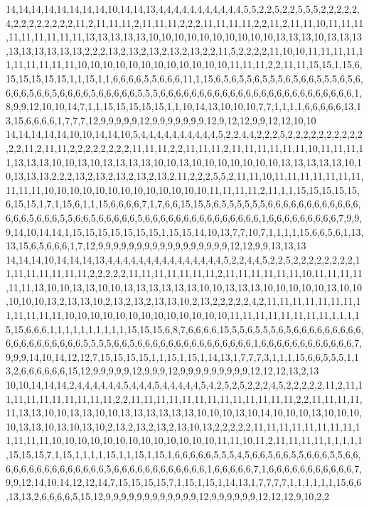 14,14,14,14,14,14,14,14,10,14,14,13,4,4,4,4,4,4,4,4,4,4,4,5,5,2,2,5,2,2,5,5,5,2,2,2,2,2,4,2,2,2,2,2,2,2,2,11,2,11,11,11,2,11,11,11,2,2,2,11,11,11,11,2,2,11,2,11,11,10,11,11,11,11,11,11,11,11,11,13,13,13,13,13,10,10,10,10,10,10,10,10,10,10,13,13,13,10,13,13,13,13,13,13,13,13,13,2,2,2,13,2,13,2,13,2,13,2,13,2,2,11,5,2,2,2,2,11,10,10,11,11,11,11,11,11,11,11,11,11,10,10,10,10,10,10,10,10,10,10,10,10,11,11,11,2,2,11,11,15,15,1,15,6,15,15,15,15,15,1,1,15,1,1,6,6,6,6,5,5,6,6,6,11,1,15,6,5,6,5,5,6,5,5,5,6,5,6,6,5,5,5,6,5,6,6,6,6,5,6,6,5,6,6,6,6,5,6,6,6,6,6,5,5,5,6,6,6,6,6,6,6,6,6,6,6,6,6,6,6,6,6,6,6,6,6,6,6,6,6,1,8,9,9,12,10,10,14,7,1,1,15,15,15,15,15,1,1,10,14,13,10,10,10,7,7,1,1,1,1,6,6,6,6,6,13,13,15,6,6,6,6,1,7,7,7,12,9,9,9,9,9,12,9,9,9,9,9,9,9,12,9,12,12,9,9,12,12,10,10
14,14,14,14,14,10,10,14,14,10,5,4,4,4,4,4,4,4,4,4,4,5,2,2,4,4,2,2,2,5,2,2,2,2,2,2,2,2,2,2,2,2,11,2,11,11,2,2,2,2,2,2,2,2,11,11,11,2,2,11,11,11,2,11,11,11,11,11,11,10,11,11,11,11,13,13,13,10,10,13,10,13,13,13,13,10,10,13,10,10,10,10,10,10,10,13,13,13,13,13,10,10,13,13,13,2,2,2,13,2,13,2,13,2,13,2,13,2,11,2,2,2,5,5,2,11,11,10,11,11,11,11,11,11,11,11,11,11,10,10,10,10,10,10,10,10,10,10,10,10,10,11,11,11,11,2,11,1,1,15,15,15,15,15,6,15,15,1,7,1,15,6,1,1,15,6,6,6,6,7,1,7,6,6,15,15,5,6,5,5,5,5,5,5,6,6,6,6,6,6,6,6,6,6,6,6,6,6,6,5,6,6,6,5,5,6,6,5,6,6,6,6,6,5,6,6,6,6,6,6,6,6,6,6,6,6,6,6,6,1,6,6,6,6,6,6,6,6,6,7,9,9,9,14,10,14,14,1,15,15,15,15,15,15,15,1,15,15,14,10,13,7,7,10,7,1,1,1,1,15,6,6,5,6,1,13,13,15,6,5,6,6,6,1,7,12,9,9,9,9,9,9,9,9,9,9,9,9,9,9,9,9,9,12,12,9,9,13,13,13
14,14,14,10,14,14,14,13,4,4,4,4,4,4,4,4,4,4,4,4,4,4,4,5,2,2,4,4,5,2,2,5,2,2,2,2,2,2,2,2,11,11,11,11,11,11,11,2,2,2,2,2,11,11,11,11,11,11,11,2,11,11,11,11,11,11,10,11,11,11,11,11,11,13,10,10,13,13,10,10,13,13,13,13,13,13,10,10,13,13,13,10,10,10,10,10,13,10,10,10,10,10,13,2,13,13,10,2,13,2,13,2,13,13,10,2,13,2,2,2,2,2,4,2,11,11,11,11,11,11,11,11,11,11,11,11,10,10,10,10,10,10,10,10,10,10,10,10,10,11,11,11,11,11,11,11,11,1,1,1,15,15,6,6,6,1,1,1,1,1,1,1,1,1,1,15,15,15,6,8,7,6,6,6,6,15,5,5,6,5,5,5,6,5,6,6,6,6,6,6,6,6,6,6,6,6,6,6,6,6,6,6,6,5,5,5,5,6,6,5,6,6,6,6,6,6,6,6,6,6,6,6,6,6,6,1,6,6,6,6,6,6,6,6,6,6,6,6,7,9,9,9,14,10,14,12,12,7,15,15,15,15,1,1,15,1,15,1,14,13,1,7,7,7,3,1,1,1,15,6,6,5,5,5,1,13,2,6,6,6,6,6,6,15,12,9,9,9,9,9,12,9,9,9,12,9,9,9,9,9,9,9,9,9,12,12,12,13,2,13
10,10,14,14,14,2,4,4,4,4,4,4,5,4,4,4,5,4,4,4,4,4,5,4,2,5,2,5,2,2,2,4,5,2,2,2,2,2,11,2,11,11,11,11,11,11,11,11,11,11,2,2,11,11,11,11,11,11,11,11,11,11,11,11,11,2,2,11,11,11,11,11,13,13,10,10,13,13,10,10,13,13,13,13,13,13,10,10,10,13,10,14,10,10,10,13,10,10,10,10,13,13,10,13,10,13,10,2,13,2,13,2,13,2,13,10,13,2,2,2,2,2,11,11,11,11,11,11,11,11,11,11,11,11,10,10,10,10,10,10,10,10,10,10,10,10,10,11,11,10,11,2,11,11,11,11,1,1,1,1,1,15,15,15,7,1,15,1,1,1,1,15,1,1,15,1,15,1,6,6,6,6,6,5,5,5,4,5,6,6,5,6,6,5,5,6,6,6,5,5,6,6,6,6,6,6,6,6,6,6,6,6,6,6,6,5,6,6,6,6,6,6,6,6,6,6,6,6,1,6,6,6,6,6,7,1,6,6,6,6,6,6,6,6,6,6,6,7,9,9,12,14,10,14,12,12,14,7,15,15,15,15,7,1,15,1,15,1,14,13,1,7,7,7,7,1,1,1,1,1,1,15,6,6,13,13,2,6,6,6,6,5,15,12,9,9,9,9,9,9,9,9,9,9,9,9,12,9,9,9,9,9,9,12,12,12,9,10,2,2
